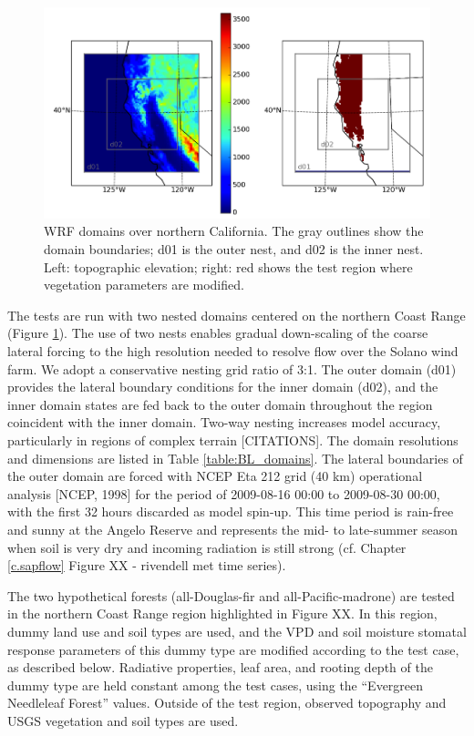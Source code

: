 \begin{figure}[here]
\includegraphics[width=1\textwidth]{ch2-BL/figures/domain_map_cropped.png}
\caption{WRF domains over northern California.  The gray outlines show the domain boundaries; d01 is the outer nest, and d02 is the inner nest.  Left: topographic elevation; right: red shows the test region where vegetation parameters are modified.}
\label{fig:BL_domain}
\end{figure}

The tests are run with two nested domains centered on the northern Coast Range (Figure \ref{fig:BL_domain}).  The use of two nests enables gradual down-scaling of the coarse lateral forcing to the high resolution needed to resolve flow over the Solano wind farm.  We adopt a conservative nesting grid ratio of 3:1.  The outer domain (d01) provides the lateral boundary conditions for the inner domain (d02), and the inner domain states are fed back to the outer domain throughout the region coincident with the inner domain.  Two-way nesting increases model accuracy, particularly in regions of complex terrain [CITATIONS].  The domain resolutions and dimensions are listed in Table \ref{table:BL_domains}.  The lateral boundaries of the outer domain are forced with NCEP Eta 212 grid (40 km) operational analysis [NCEP, 1998] for the period of 2009-08-16 00:00 to 2009-08-30 00:00, with the first 32 hours discarded as model spin-up.  This time period is rain-free and sunny at the Angelo Reserve and represents the mid- to late-summer season when soil is very dry and incoming radiation is still strong (cf. Chapter \ref{c.sapflow} Figure XX - rivendell met time series).

The two hypothetical forests (all-Douglas-fir and all-Pacific-madrone) are tested in the northern Coast Range region highlighted in Figure XX.  In this region, dummy land use and soil types are used, and the VPD and soil moisture stomatal response parameters of this dummy type are modified according to the test case, as described below.  Radiative properties, leaf area, and rooting depth of the dummy type are held constant among the test cases, using the ``Evergreen Needleleaf Forest'' values.  Outside of the test region, observed topography and USGS vegetation and soil types are used.

